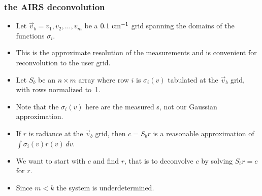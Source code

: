 \documentclass[10pt]{beamer}
\begin{document}
\begin{frame}
\begin{columns}[t]
\begin{column}{0.5\textwidth}
\end{column}
\end{columns}
\end{frame}
\begin{frame}
\frametitle{the AIRS deconvolution}
\begin{itemize}

  \item Let $\vec v_b = v_1,v_2,\ldots,v_m$ be a $0.1~\mbox{cm$^{-1}$}$ grid
    spanning the domains of the functions $\sigma_i$.

  \item This is the approximate resolution of the {\srf}
    measurements and is convenient for reconvolution to the {\cris}
    user grid.

  \item Let $S_b$ be an $n\times m$ array where row $i$ is
    $\sigma_i(v)$ tabulated at the $\vec v_b$ grid, with rows
    normalized to~1.

  \item Note that the $\sigma_i(v)$ here are the measured {\srf}s,
    not our Gaussian approximation.

  \item If $r$ is radiance at the $\vec v_b$ grid, then $c = S_b r$
    is a reasonable approximation of $\int\sigma_i(v)r(v)\,dv$.

  \item We want to start with $c$ and find $r$, that is to
    deconvolve $c$ by solving $S_b r = c$ for $r$.  

  \item Since $m < k$ the system is underdetermined.  

\end{itemize}
\end{frame}
\end{document}
